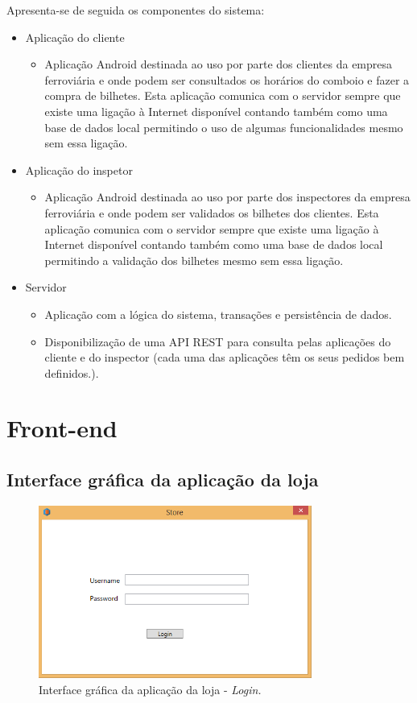 \documentclass[12pt]{article}
\begin{document}
Apresenta-se de seguida os componentes do sistema:
\begin{itemize}
\item Aplicação do cliente
\begin{itemize}
\item Aplicação Android destinada ao uso por parte dos clientes da empresa ferroviária e onde podem ser consultados os horários do comboio e fazer a compra de bilhetes. Esta aplicação comunica com o servidor sempre que existe uma ligação à Internet disponível contando também como uma base de dados local permitindo o uso de algumas funcionalidades mesmo sem essa ligação.
\end{itemize}
\item Aplicação do inspetor
\begin{itemize}
\item Aplicação Android destinada ao uso por parte dos inspectores da empresa ferroviária e onde podem ser validados os bilhetes dos clientes. Esta aplicação comunica com o servidor sempre que existe uma ligação à Internet disponível contando também como uma base de dados local permitindo a validação dos bilhetes mesmo sem essa ligação.
\end{itemize}
\item Servidor
\begin{itemize}
\item Aplicação com a lógica do sistema, transações e persistência de dados.
\item Disponibilização de uma API REST para consulta pelas aplicações do cliente e do inspector (cada uma das aplicações têm os seus pedidos bem definidos.).
\end{itemize}
\end{itemize}


\section{Front-end}

\subsection{Interface gráfica da aplicação da loja}

\begin{figure}[H]
    \centering
    \includegraphics[width=0.8\textwidth]{Store_GUI_Login.png}
    \caption{Interface gráfica da aplicação da loja - \textit{Login.}}
    \label{fig:c1}
\end{figure}
\end{document}
